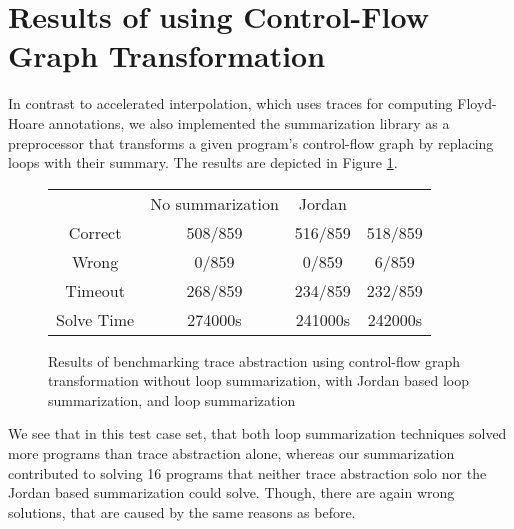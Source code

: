 \section{Results of using Control-Flow Graph Transformation}
In contrast to accelerated interpolation, which uses traces for computing Floyd-Hoare annotations, we also implemented the \qvasr summarization library as a preprocessor that transforms a given program's control-flow graph by replacing loops with their summary. The results are depicted in Figure \ref{table_tff}.
\begin{figure}[H]
	\centering
	\begin{tabular}{cccc}
		\toprule
		& No summarization & Jordan & \qvasr \\
		\cmidrule{1-4}
		Correct & 508/859 & 516/859 & 518/859 \\
		Wrong & 0/859 & 0/859 & 6/859 \\
		Timeout & 268/859 & 234/859 & 232/859 \\
		Solve Time &  274000s & 241000s & 242000s
	\end{tabular}
	\caption{Results of benchmarking trace abstraction using control-flow graph transformation without loop summarization, with Jordan based loop summarization, and \qvasr loop summarization}
	\label{table_tff}
\end{figure}
We see that in this test case set, that both loop summarization techniques solved more programs than trace abstraction alone, whereas our \qvasr summarization contributed to solving 16 programs that neither trace abstraction solo nor the Jordan based summarization could solve. Though, there are again wrong solutions, that are caused by the same reasons as before. \par 